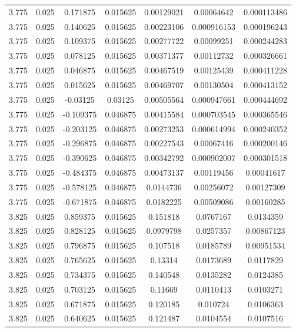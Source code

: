 \begin{flushleft}
\begin{longtable}{ccccccc}
3.775 & 0.025 & 0.171875 & 0.015625 & 0.00129021 & 0.00064642 & 0.000113486  \\ 
3.775 & 0.025 & 0.140625 & 0.015625 & 0.00223106 & 0.000916153 & 0.000196243  \\ 
3.775 & 0.025 & 0.109375 & 0.015625 & 0.00277722 & 0.00099251 & 0.000244283  \\ 
3.775 & 0.025 & 0.078125 & 0.015625 & 0.00371377 & 0.00112732 & 0.000326661  \\ 
3.775 & 0.025 & 0.046875 & 0.015625 & 0.00467519 & 0.00125439 & 0.000411228  \\ 
3.775 & 0.025 & 0.015625 & 0.015625 & 0.00469707 & 0.00130504 & 0.000413152  \\ 
3.775 & 0.025 & -0.03125 & 0.03125 & 0.00505564 & 0.000947661 & 0.000444692  \\ 
3.775 & 0.025 & -0.109375 & 0.046875 & 0.00415584 & 0.000703545 & 0.000365546  \\ 
3.775 & 0.025 & -0.203125 & 0.046875 & 0.00273253 & 0.000614994 & 0.000240352  \\ 
3.775 & 0.025 & -0.296875 & 0.046875 & 0.00227543 & 0.00067416 & 0.000200146  \\ 
3.775 & 0.025 & -0.390625 & 0.046875 & 0.00342792 & 0.000902007 & 0.000301518  \\ 
3.775 & 0.025 & -0.484375 & 0.046875 & 0.00473137 & 0.00119456 & 0.00041617  \\ 
3.775 & 0.025 & -0.578125 & 0.046875 & 0.0144736 & 0.00256072 & 0.00127309  \\ 
3.775 & 0.025 & -0.671875 & 0.046875 & 0.0182225 & 0.00509086 & 0.00160285  \\ 
3.825 & 0.025 & 0.859375 & 0.015625 & 0.151818 & 0.0767167 & 0.0134359  \\ 
3.825 & 0.025 & 0.828125 & 0.015625 & 0.0979798 & 0.0257357 & 0.00867123  \\ 
3.825 & 0.025 & 0.796875 & 0.015625 & 0.107518 & 0.0185789 & 0.00951534  \\ 
3.825 & 0.025 & 0.765625 & 0.015625 & 0.13314 & 0.0173689 & 0.0117829  \\ 
3.825 & 0.025 & 0.734375 & 0.015625 & 0.140548 & 0.0135282 & 0.0124385  \\ 
3.825 & 0.025 & 0.703125 & 0.015625 & 0.11669 & 0.0110413 & 0.0103271  \\ 
3.825 & 0.025 & 0.671875 & 0.015625 & 0.120185 & 0.010724 & 0.0106363  \\ 
3.825 & 0.025 & 0.640625 & 0.015625 & 0.121487 & 0.0104554 & 0.0107516  \\ 

\end{longtable}
\end{flushleft}
